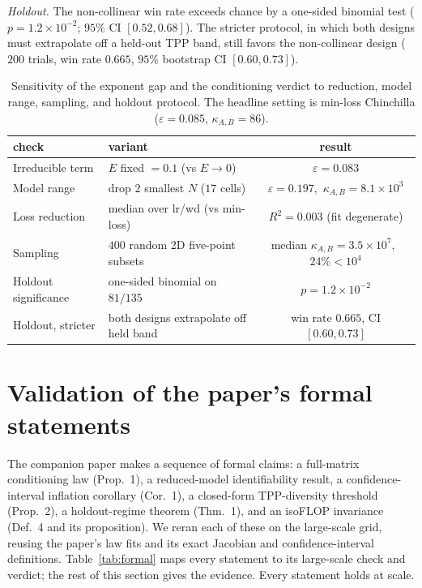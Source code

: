 \documentclass[11pt]{article}
\newcommand{\kAB}{\kappa_{A,B}}
\begin{document}
\emph{Holdout.} The non-collinear win rate exceeds chance by a one-sided binomial test
($p=1.2\times10^{-2}$; $95\%$ CI $[0.52,0.68]$). The stricter protocol, in which both designs
must extrapolate off a held-out TPP band, still favors the non-collinear design ($200$ trials, win
rate $0.665$, $95\%$ bootstrap CI $[0.60,0.73]$).

\begin{table}[t]
\centering
\caption{Sensitivity of the exponent gap and the conditioning verdict to reduction, model range,
sampling, and holdout protocol. The headline setting is min-loss Chinchilla
($\varepsilon=0.085$, $\kAB=86$).}
\label{tab:robust}
\begin{tabular}{llc}
\toprule
\textbf{check} & \textbf{variant} & \textbf{result}\\
\midrule
Irreducible term     & $E$ fixed ${=}0.1$ (vs $E\!\to\!0$)        & $\varepsilon=0.083$\\
Model range          & drop $2$ smallest $N$ ($17$ cells)         & $\varepsilon=0.197$,\ $\kAB=8.1\times10^{3}$\\
Loss reduction       & median over lr/wd (vs min-loss)            & $R^2=0.003$ (fit degenerate)\\
Sampling             & $400$ random 2D five-point subsets         & median $\kAB=3.5\times10^{7}$,\ $24\%{<}10^{4}$\\
Holdout significance & one-sided binomial on $81/135$             & $p=1.2\times10^{-2}$\\
Holdout, stricter    & both designs extrapolate off held band     & win rate $0.665$, CI $[0.60,0.73]$\\
\bottomrule
\end{tabular}
\end{table}

\section{Validation of the paper's formal statements}
\label{sec:formal-validation}

The companion paper makes a sequence of formal claims: a full-matrix conditioning law (Prop.~1), a
reduced-model identifiability result, a confidence-interval inflation corollary (Cor.~1), a
closed-form TPP-diversity threshold (Prop.~2), a holdout-regime theorem (Thm.~1), and an isoFLOP
invariance (Def.~4 and its proposition). We reran each of these on the large-scale grid, reusing
the paper's law fits and its exact Jacobian and confidence-interval definitions. Table~\ref{tab:formal}
maps every statement to its large-scale check and verdict; the rest of this section gives the
evidence. Every statement holds at scale.
\end{document}
